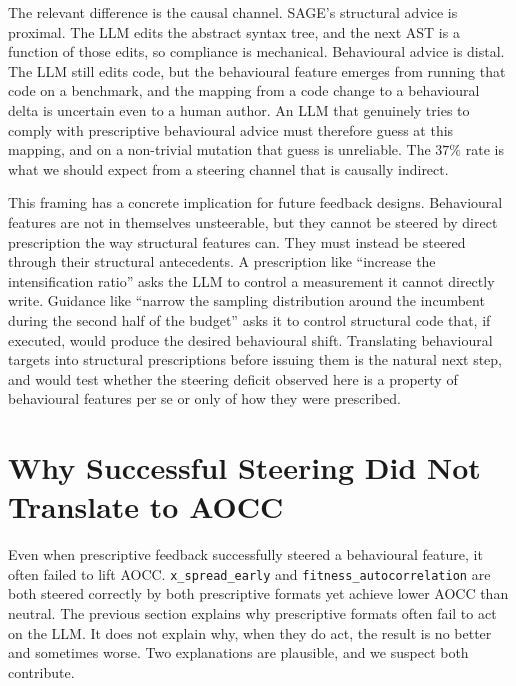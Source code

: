 The relevant difference is the causal channel. SAGE's structural advice is proximal. The LLM edits the abstract syntax tree, and the next AST is a function of those edits, so compliance is mechanical. Behavioural advice is distal. The LLM still edits code, but the behavioural feature emerges from running that code on a benchmark, and the mapping from a code change to a behavioural delta is uncertain even to a human author. An LLM that genuinely tries to comply with prescriptive behavioural advice must therefore guess at this mapping, and on a non-trivial mutation that guess is unreliable. The $37\%$ rate is what we should expect from a steering channel that is causally indirect.

This framing has a concrete implication for future feedback designs. Behavioural features are not in themselves unsteerable, but they cannot be steered by direct prescription the way structural features can. They must instead be steered through their structural antecedents. A prescription like ``increase the intensification ratio'' asks the LLM to control a measurement it cannot directly write. Guidance like ``narrow the sampling distribution around the incumbent during the second half of the budget'' asks it to control structural code that, if executed, would produce the desired behavioural shift. Translating behavioural targets into structural prescriptions before issuing them is the natural next step, and would test whether the steering deficit observed here is a property of behavioural features per se or only of how they were prescribed.

\section{Why Successful Steering Did Not Translate to AOCC}
\label{sec:discussion-steering}

Even when prescriptive feedback successfully steered a behavioural feature, it often failed to lift AOCC. \texttt{x\_spread\_early} and \texttt{fitness\_autocorrelation} are both steered correctly by both prescriptive formats yet achieve lower AOCC than neutral. The previous section explains why prescriptive formats often fail to act on the LLM. It does not explain why, when they do act, the result is no better and sometimes worse. Two explanations are plausible, and we suspect both contribute.

